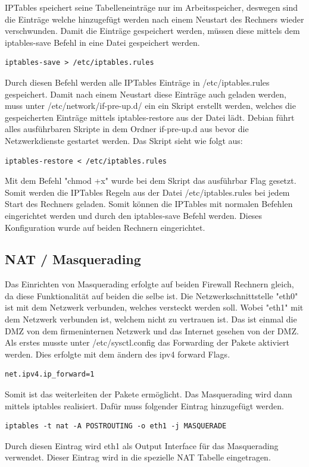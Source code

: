 IPTables speichert seine Tabelleneinträge nur im Arbeitsspeicher, deswegen sind die Einträge welche hinzugefügt werden nach einem Neustart des Rechners wieder verschwunden. Damit die Einträge gespeichert werden, müssen diese mittels dem iptables-save Befehl in eine Datei gespeichert werden. 
\begin{lstlisting}
iptables-save > /etc/iptables.rules
\end{lstlisting}
Durch diesen Befehl werden alle IPTables Einträge in /etc/iptables.rules gespeichert. Damit nach einem Neustart diese Einträge auch geladen werden, muss unter /etc/network/if-pre-up.d/ ein ein Skript erstellt werden, welches die gespeicherten Einträge mittels iptables-restore aus der Datei lädt. Debian führt alles ausführbaren Skripte in dem Ordner if-pre-up.d aus bevor die Netzwerkdienste gestartet werden. Das Skript sieht wie folgt aus:
\begin{lstlisting}[caption={/etc/network/if-pre-up.d/iptables}]
iptables-restore < /etc/iptables.rules
\end{lstlisting}
Mit dem Befehl "chmod +x" wurde bei dem Skript das ausführbar Flag gesetzt. Somit werden die IPTables Regeln aus der Datei /etc/iptables.rules bei jedem Start des Rechners geladen. Somit können die IPTables mit normalen Befehlen eingerichtet werden und durch den iptables-save Befehl werden. Dieses Konfiguration wurde auf beiden Rechnern eingerichtet.


\subsection{NAT / Masquerading}
Das Einrichten von Masquerading erfolgte auf beiden Firewall Rechnern gleich, da diese Funktionalität auf beiden die selbe ist. Die Netzwerkschnittstelle "eth0" ist mit dem Netzwerk verbunden, welches versteckt werden soll. Wobei "eth1" mit dem Netzwerk verbunden ist, welchem nicht zu vertrauen ist. Das ist einmal die DMZ von dem firmeninternen Netzwerk und das Internet gesehen von der DMZ. \\
Als erstes musste unter /etc/sysctl.config das Forwarding der Pakete aktiviert werden. Dies erfolgte mit dem ändern des ipv4 forward Flags.
\begin{lstlisting}
net.ipv4.ip_forward=1
\end{lstlisting}
Somit ist das weiterleiten der Pakete ermöglicht. Das Masquerading wird dann mittels iptables realisiert. Dafür muss folgender Eintrag hinzugefügt werden.
\begin{lstlisting}
iptables -t nat -A POSTROUTING -o eth1 -j MASQUERADE
\end{lstlisting}
Durch diesen Eintrag wird eth1 als Output Interface für das Masquerading verwendet. Dieser Eintrag wird in die spezielle NAT Tabelle eingetragen.